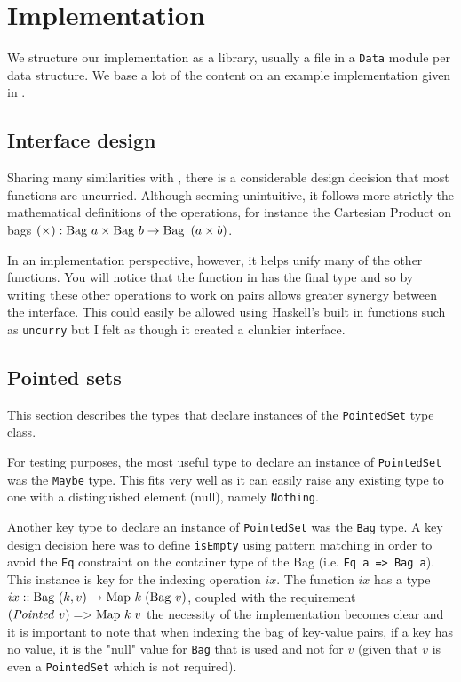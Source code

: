 \section{Implementation}
We structure our implementation as a library, usually a file in a \texttt{Data}
module per data structure. We base a lot of the content on an example
implementation given in
\cite{RelationalAlgebraByWayOfAdjunctionsPrototypeImplementation}.

\subsection{Interface design}
Sharing many similarities with \cite{RelationalAlgebraByWayOfAdjunctions}, there
is a considerable design decision that most functions are uncurried. Although
seeming unintuitive, it follows more strictly the mathematical definitions of
the operations, for instance the Cartesian Product on bags $(\times): \mathrm{Bag}\ a
\times \mathrm{Bag}\ b \to \mathrm{Bag}\ \left(a \times b\right)$.

In an implementation perspective, however, it helps unify many of the other
functions. You will notice that the  function in
\cite{RelationalAlgebraByWayOfAdjunctions} has the final type  and so by writing these other operations to work on pairs allows
greater synergy between the interface. This could easily be allowed using
Haskell's built in functions\cite{Prelude} such as \texttt{uncurry} but I felt
as though it created a clunkier interface.

\subsection{Pointed sets}
This section describes the types that declare instances of the
\texttt{PointedSet} type class.

For testing purposes, the most useful type to declare an instance of
\texttt{PointedSet} was the \texttt{Maybe} type. This fits very well as it can
easily raise any existing type to one with a distinguished element (null),
namely \texttt{Nothing}.

Another key type to declare an instance of \texttt{PointedSet} was the
\texttt{Bag} type. A key design decision here was to define \texttt{isEmpty}
using pattern matching in order to avoid the \texttt{Eq} constraint on the
container type of the Bag (i.e. \texttt{Eq a => Bag a}). This instance is key
for the indexing operation $ix$. The function $ix$ has a type $ix ::
\mathrm{Bag}\ (k, v) \to \mathrm{Map}\ k\;(\mathrm{Bag}\ v)$, coupled with the requirement $(\mathit{Pointed}\ v)
=> \mathrm{Map}\ k\;v$ the necessity of the implementation becomes clear and it is
important to note that when indexing the bag of key-value pairs, if a key has no
value, it is the "null" value for \texttt{Bag} that is used and not for $v$
(given that $v$ is even a \texttt{PointedSet} which is not required).


